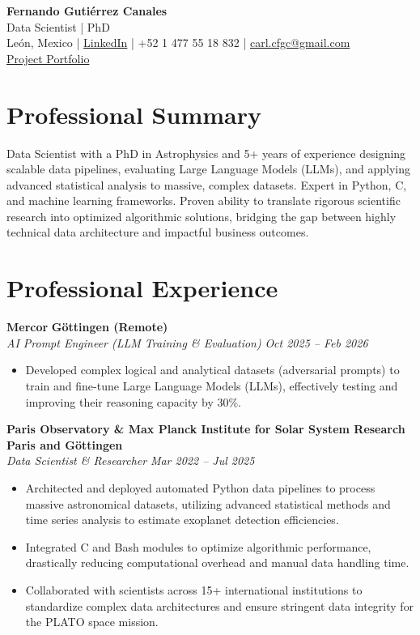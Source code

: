 \documentclass[10pt,a4paper]{article}
\begin{document}
\begin{center}
    {\Huge \textbf{Fernando Gutiérrez Canales}}\\
    {\Large Data Scientist | PhD}\\    
    León, Mexico \quad | \quad \href{https://www.linkedin.com/in/fernando-guti%C3%A9rrez-canales-804876343/}{LinkedIn} \quad | \quad +52 1 477 55 18 832 \quad | \quad \href{mailto:carl.cfgc@gmail.com}{carl.cfgc@gmail.com} \\
	\href{https://fernando-canales.github.io/#projects}{Project Portfolio}
\end{center}

\vspace{1em}

\section*{Professional Summary}
Data Scientist with a PhD in Astrophysics and 5+ years of experience designing scalable data pipelines, evaluating Large Language Models (LLMs), and applying advanced statistical analysis to massive, complex datasets. Expert in Python, C, and machine learning frameworks. Proven ability to translate rigorous scientific research into optimized algorithmic solutions, bridging the gap between highly technical data architecture and impactful business outcomes.

\section*{Professional Experience}
\textbf{Mercor} \hfill \textbf{Göttingen (Remote)} \\
\textit{AI Prompt Engineer (LLM Training \& Evaluation)} \hfill \textit{Oct 2025 -- Feb 2026}
\begin{itemize}[leftmargin=1.5em]
	\item Developed complex logical and analytical datasets (adversarial prompts) to train and fine-tune Large Language Models (LLMs), effectively testing and improving their reasoning capacity by 30\%.
\end{itemize}

\textbf{Paris Observatory \& Max Planck Institute for Solar System Research} \hfill \textbf{Paris and Göttingen} \\
\textit{Data Scientist \& Researcher} \hfill \textit{Mar 2022 -- Jul 2025}
\begin{itemize}[leftmargin=1.5em]
    \item Architected and deployed automated Python data pipelines to process massive astronomical datasets, utilizing advanced statistical methods and time series analysis to estimate exoplanet detection efficiencies.
    \item Integrated C and Bash modules to optimize algorithmic performance, drastically reducing computational overhead and manual data handling time.
    \item Collaborated with scientists across 15+ international institutions to standardize complex data architectures and ensure stringent data integrity for the PLATO space mission.
\end{itemize}
\end{document}
